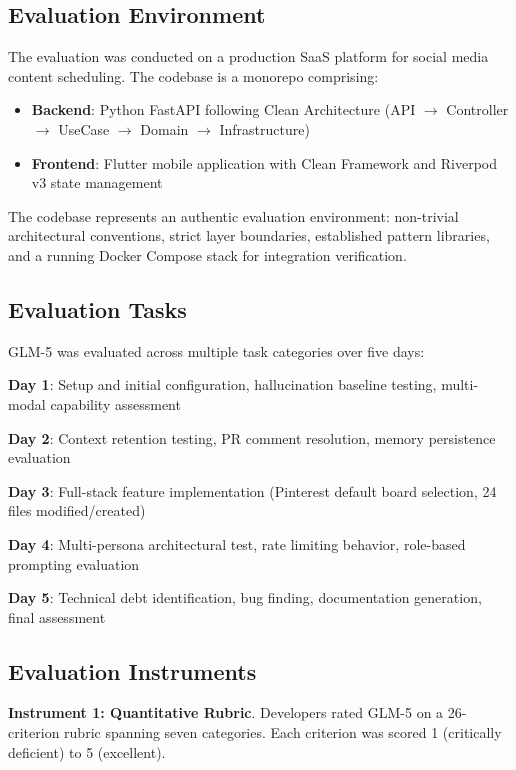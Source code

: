 \documentclass[conference]{IEEEtran}
\begin{document}
\subsection{Evaluation Environment}
The evaluation was conducted on a production SaaS platform for social media content scheduling. The codebase is a monorepo comprising:
\begin{itemize}
    \item \textbf{Backend}: Python FastAPI following Clean Architecture (API $\rightarrow$ Controller $\rightarrow$ UseCase $\rightarrow$ Domain $\rightarrow$ Infrastructure)
    \item \textbf{Frontend}: Flutter mobile application with Clean Framework and Riverpod v3 state management
\end{itemize}

The codebase represents an authentic evaluation environment: non-trivial architectural conventions, strict layer boundaries, established pattern libraries, and a running Docker Compose stack for integration verification.

\subsection{Evaluation Tasks}
GLM-5 was evaluated across multiple task categories over five days:

\textbf{Day 1}: Setup and initial configuration, hallucination baseline testing, multi-modal capability assessment

\textbf{Day 2}: Context retention testing, PR comment resolution, memory persistence evaluation

\textbf{Day 3}: Full-stack feature implementation (Pinterest default board selection, 24 files modified/created)

\textbf{Day 4}: Multi-persona architectural test, rate limiting behavior, role-based prompting evaluation

\textbf{Day 5}: Technical debt identification, bug finding, documentation generation, final assessment

\subsection{Evaluation Instruments}

\textbf{Instrument 1: Quantitative Rubric}. Developers rated GLM-5 on a 26-criterion rubric spanning seven categories. Each criterion was scored 1 (critically deficient) to 5 (excellent).
\end{document}
